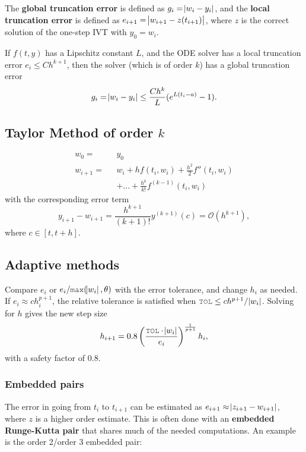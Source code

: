 \begin{definition}
The \textbf{global truncation error} is defined as $g_i = \abs{w_i-y_i}$, and the \textbf{local truncation error} is defined as $e_{i+1} = \abs{w_{i+1} - z(t_{i+1})}$, where $z$ is the correct solution of the one-step IVT with $y_0 = w_i$.
\end{definition}

\begin{theorem}
If $f(t,y)$ has a Lipschitz constant $L$, and the ODE solver has a local truncation error $e_i \leq C h^{k+1}$, then the solver (which is of order $k$) has a global truncation error
$$
g_i = \abs{w_i - y_i} \leq \frac{Ch^k}{L}(e^{L(t_i - a)} - 1).
$$
\end{theorem}

\subsection{Taylor Method of order $k$}
\begin{align*}
    w_0 = \text{ }&y_0 \\
    w_{i+1} = \text{ }&w_i + h f(t_i, w_i) + \frac{h^2}{2} f''(t_i, w_i) \\
    \text{ }&+ ... + \frac{h^k}{k!}f^{(k-1)}(t_i, w_i)
\end{align*}
with the corresponding error term 
$$
y_{i+1} - w_{i+1}  =  \frac{h^{k+1}}{(k+1)!}y^{(k+1)}(c) = \mathcal{O}(h^{k+1}),
$$
where $c \in [t, t+h]$.

\subsection{Adaptive methods}
Compare $e_i$ or $e_i/\mcode{max}(\abs{w_i}, \theta)$ with the error tolerance, and change $h_i$ as needed. If $e_i \approx ch_i^{p+1}$, the relative tolerance  is satisfied when $\mcode{TOL} \leq ch^{p+1} / \abs{w_i}$. Solving for $h$ gives the new step size
$$
h_{i+1} = 0.8\left(\frac{\mcode{TOL} \cdot \abs{w_i}}{e_i}\right)^{\frac{1}{p+1}} h_i,
$$
with a safety factor of $0.8$.

\subsubsection{Embedded pairs}
The error in going from $t_i$ to $t_{i+1}$ can be estimated as $e_{i+1} \approx \abs{z_{i+1} - w_{i+1}}$, where $z$ is a higher order estimate. This is often done with an \textbf{embedded Runge-Kutta pair} that shares much of the needed computations. An example is the order 2/order 3 embedded pair:

